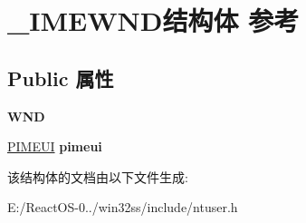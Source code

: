 \hypertarget{struct___i_m_e_w_n_d}{}\section{\+\_\+\+I\+M\+E\+W\+N\+D结构体 参考}
\label{struct___i_m_e_w_n_d}
\subsection*{Public 属性}
\begin{DoxyCompactItemize}
\item 
\mbox{\label{struct___i_m_e_w_n_d_aee8af7cfdacfd938101bd0ca9d3a4dde}} 
{\bfseries W\+ND}
\item 
\mbox{\label{struct___i_m_e_w_n_d_ade171f280d0840a14235c5f60addd6d3}} 
\hyperlink{structtag_i_m_e_u_i}{P\+I\+M\+E\+UI} {\bfseries pimeui}
\end{DoxyCompactItemize}


该结构体的文档由以下文件生成\+:\begin{DoxyCompactItemize}
\item 
E\+:/\+React\+O\+S-\/0../win32ss/include/ntuser.\+h\end{DoxyCompactItemize}
